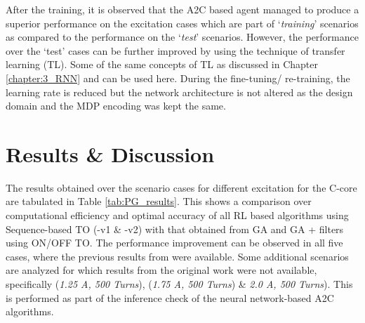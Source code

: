 After the training, it is observed that the A2C based agent managed to produce a superior performance on the excitation cases which are part of `\textit{training}' scenarios as compared to the performance on the `\textit{test}' scenarios. However, the performance over the `test' cases can be further improved by using the technique of transfer learning (TL). Some of the same concepts of TL as discussed in Chapter \ref{chapter:3_RNN} and \parencite{khan_transfer} can be used here. During the fine-tuning/ re-training, the learning rate is reduced but the network architecture is not altered as the design domain and the MDP encoding was kept the same.

\section{Results \& Discussion}

The results obtained over the scenario cases for different excitation for the C-core are tabulated in Table \ref{tab:PG_results}. This shows a comparison over computational efficiency and optimal accuracy of all RL based algorithms using Sequence-based TO (-v1 \& -v2) with that obtained from GA \parencite{park2009magnetic} and GA + filters \parencite{midha2019selection} using ON/OFF TO. The performance improvement can be observed in all five cases, where the previous results from \cite{midha2019selection} were available. Some additional scenarios are analyzed for which results from the original work \parencite{midha_2018} were not available, specifically (\textit{1.25 A, 500 Turns}), (\textit{1.75 A, 500 Turns}) \& \textit{2.0 A, 500 Turns}). 
This is performed as part of the inference check of the neural network-based A2C algorithms.

